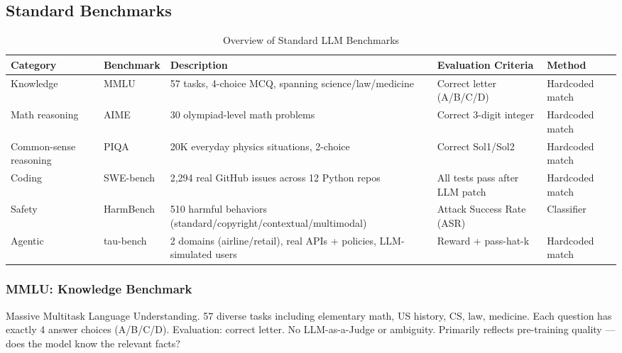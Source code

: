 \documentclass[11pt, a4paper]{article}
\begin{document}
\subsection{Standard Benchmarks}

\begin{table}[h]
\centering
\caption{Overview of Standard LLM Benchmarks}
\begin{tabular}{@{}p{2cm}p{2.5cm}p{3.5cm}p{3cm}p{2cm}@{}}
\toprule
\textbf{Category} & \textbf{Benchmark} & \textbf{Description} & \textbf{Evaluation Criteria} & \textbf{Method} \\
\midrule
Knowledge & MMLU & 57 tasks, 4-choice MCQ, spanning science/law/medicine & Correct letter (A/B/C/D) & Hardcoded match \\
\addlinespace
Math reasoning & AIME & 30 olympiad-level math problems & Correct 3-digit integer & Hardcoded match \\
\addlinespace
Common-sense reasoning & PIQA & 20K everyday physics situations, 2-choice & Correct Sol1/Sol2 & Hardcoded match \\
\addlinespace
Coding & SWE-bench & 2,294 real GitHub issues across 12 Python repos & All tests pass after LLM patch & Hardcoded match \\
\addlinespace
Safety & HarmBench & 510 harmful behaviors (standard/copyright/contextual/multimodal) & Attack Success Rate (ASR) & Classifier \\
\addlinespace
Agentic & tau-bench & 2 domains (airline/retail), real APIs + policies, LLM-simulated users & Reward + pass-hat-k & Hardcoded match \\
\bottomrule
\end{tabular}
\end{table}

\subsubsection{MMLU: Knowledge Benchmark}

\begin{defbox}
Massive Multitask Language Understanding. 57 diverse tasks including elementary math, US history, CS, law, medicine. Each question has exactly 4 answer choices (A/B/C/D). Evaluation: correct letter. No LLM-as-a-Judge or ambiguity. Primarily reflects pre-training quality --- does the model know the relevant facts?
\end{defbox}
\end{document}
